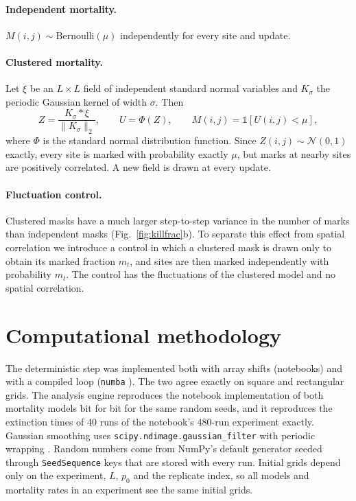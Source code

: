 \documentclass[11pt,a4paper]{article}
\begin{document}
\paragraph{Independent mortality.} $M(i,j)\sim\mathrm{Bernoulli}(\mu)$ independently for every site and update.

\paragraph{Clustered mortality.} Let $\xi$ be an $L\times L$ field of independent standard normal variables and $K_\sigma$ the periodic Gaussian kernel of width $\sigma$. Then
\begin{equation}
Z=\frac{K_\sigma*\xi}{\lVert K_\sigma\rVert_2},\qquad U=\Phi(Z),\qquad M(i,j)=\mathbb{1}\left[U(i,j)<\mu\right],
\end{equation}
where $\Phi$ is the standard normal distribution function. Since $Z(i,j)\sim\mathcal N(0,1)$ exactly, every site is marked with probability exactly $\mu$, but marks at nearby sites are positively correlated. A new field is drawn at every update.

\paragraph{Fluctuation control.} Clustered masks have a much larger step-to-step variance in the number of marks than independent masks (Fig.~\ref{fig:killfrac}b). To separate this effect from spatial correlation we introduce a control in which a clustered mask is drawn only to obtain its marked fraction $m_t$, and sites are then marked independently with probability $m_t$. The control has the fluctuations of the clustered model and no spatial correlation.

\section{Computational methodology}

The deterministic step was implemented both with array shifts (notebooks) and with a compiled loop (\texttt{numba} \cite{lam2015}). The two agree exactly on square and rectangular grids. The analysis engine reproduces the notebook implementation of both mortality models bit for bit for the same random seeds, and it reproduces the extinction times of 40 runs of the notebook's 480-run experiment exactly. Gaussian smoothing uses \texttt{scipy.ndimage.gaussian\_filter} with periodic wrapping \cite{virtanen2020}. Random numbers come from NumPy's default generator \cite{harris2020} seeded through \texttt{SeedSequence} keys that are stored with every run. Initial grids depend only on the experiment, $L$, $p_0$ and the replicate index, so all models and mortality rates in an experiment see the same initial grids.
\end{document}
